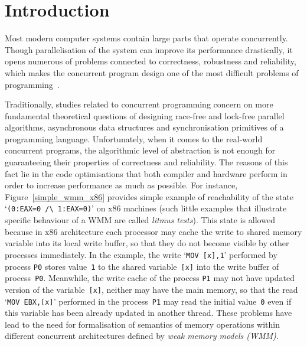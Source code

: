 \chapter{Introduction}
\label{ch:intro}


Most modern computer systems contain large parts that operate concurrently. Though parallelisation of the system can improve its performance drastically, it opens numerous of problems connected to correctness, robustness and reliability, which makes the concurrent program design one of the most difficult problems of programming~\cite{mckenney2017parallel}.

Traditionally, studies related to concurrent programming concern on more fundamental theoretical questions of designing race-free and lock-free parallel algorithms, asynchronous data structures and synchronisation primitives of a programming language. Unfortunately, when it comes to the real-world concurrent programs, the algorithmic level of abstraction is not enough for guaranteeing their properties of correctness and reliability. The reasons of this fact lie in the code optimisations that both compiler and hardware perform in order to increase performance as much as possible. For instance, Figure~\ref{simple_wmm_x86} provides simple example of reachability of the state `\texttt{(0:EAX=0~/\textbackslash~1:EAX=0)}' on x86 machines (such little examples that illustrate specific behaviour of a WMM are called \textit{litmus tests}).
This state is allowed because in x86 architecture each processor may cache the write to shared memory variable into its local write buffer, so that they do not become visible by other processes immediately. In the example, the write `\texttt{MOV~[x],1}' performed by process \texttt{P0} stores value~\texttt{1} to the shared variable~\texttt{[x]} into the write buffer of process~\texttt{P0}. Meanwhile, the write cache of the process \texttt{P1} may not have updated version of the variable~\texttt{[x]}, neither may have the main memory, so that the read `\texttt{MOV~EBX,[x]}' performed in the process~\texttt{P1} may read the initial value~\texttt{0} even if this variable has been already updated in another thread. These problems have lead to the need for formalisation of semantics of memory operations within different concurrent architectures defined by \textit{weak	memory models (WMM)}.

